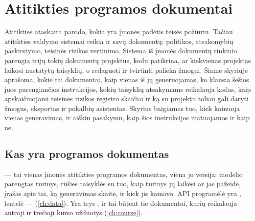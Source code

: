 \chapter{Atitikties programos dokumentai}\label{ch:programme}

Atitikties ataskaita parodo, kokia yra įmonės padėtis teisės požiūriu. Tačiau atitikties
valdymo sistemai reikia ir savų dokumentų: politikos, atsakomybių paskirstymo, teisinės
rizikos vertinimo. Sistema iš įmonės dokumentų rinkinio parengia trijų tokių dokumentų
projektus, kodu patikrina, ar kiekvienas projektas laikosi nustatytų taisyklių, o redaguoti ir
tvirtinti palieka žmogui. Šiame skyriuje aprašoma, kokie tai dokumentai, kaip vienas iš jų
generuojamas, ko klausia šešios juos parengiančios instrukcijos, kokių taisyklių atsakymams
reikalauja kodas, kaip apskaičiuojami teisinės rizikos registro skaičiai ir ką su projektu
toliau gali daryti žmogus, eksportas ir pokalbių asistentas. Skyrius baigiamas tuo, kiek
kainuoja vienas generavimas, ir aiškiu pasakymu, kaip šios instrukcijos matuojamos ir kaip
ne.


\section{Kas yra programos dokumentas}\label{sec:programme:what}

 --- tai vienas įmonės atitikties programos dokumentas, viena jo
versija: modelio parengtas turinys, rūšies taisyklės su tuo, kaip turinys jų laikėsi ar jas
pažeidė, įrašas apie tai, ką generavimas skaitė, ir kiek jis kainavo. API programėlė yra
, lentelė ---  (\cref{ch:data}). Yra trys , ir
tai būtent tie dokumentai, kurių reikalauja antroji ir trečioji kurso užduotys
(\cref{ch:course}).


